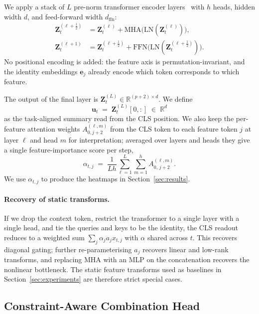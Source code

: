 \documentclass[journal]{IEEEtran}
\begin{document}
We apply a stack of $L$ pre-norm transformer encoder layers~\cite{vaswani2017attention} with $h$ heads, hidden width $d$, and feed-forward width $d_{\mathrm{ffn}}$:
\begin{align}
\mathbf{Z}_t^{(\ell+\tfrac{1}{2})} &= \mathbf{Z}_t^{(\ell)} + \mathrm{MHA}\!\bigl(\mathrm{LN}(\mathbf{Z}_t^{(\ell)})\bigr),\\
\mathbf{Z}_t^{(\ell+1)} &= \mathbf{Z}_t^{(\ell+\tfrac{1}{2})} + \mathrm{FFN}\!\bigl(\mathrm{LN}(\mathbf{Z}_t^{(\ell+\tfrac{1}{2})})\bigr).
\end{align}
No positional encoding is added: the feature axis is permutation-invariant, and the identity embeddings $\mathbf{e}_j$ already encode which token corresponds to which feature.

The output of the final layer is $\mathbf{Z}_t^{(L)} \in \mathbb{R}^{(p+2)\times d}$. We define
\begin{equation}
\mathbf{u}_t \;=\; \mathbf{Z}_t^{(L)}[0,:] \;\in\; \mathbb{R}^d
\end{equation}
as the task-aligned summary read from the CLS position. We also keep the per-feature attention weights $A^{(\ell,m)}_{0,j+2}$ from the CLS token to each feature token $j$ at layer $\ell$ and head $m$ for interpretation; averaged over layers and heads they give a single feature-importance score per step,
\begin{equation}
\label{eq:alpha}
\alpha_{t,j} \;=\; \frac{1}{Lh} \sum_{\ell=1}^{L} \sum_{m=1}^{h} A^{(\ell,m)}_{0,\,j+2}.
\end{equation}
We use $\alpha_{t,j}$ to produce the heatmaps in Section~\ref{sec:results}.

\paragraph*{Recovery of static transforms.} If we drop the context token, restrict the transformer to a single layer with a single head, and tie the queries and keys to be the identity, the CLS readout reduces to a weighted sum $\sum_j \alpha_j a_j x_{t,j}$ with $\alpha$ shared across $t$. This recovers diagonal gating; further re-parameterising $a_j$ recovers linear and low-rank transforms, and replacing $\mathrm{MHA}$ with an MLP on the concatenation recovers the nonlinear bottleneck. The static feature transforms used as baselines in Section~\ref{sec:experiments} are therefore strict special cases.

\subsection{Constraint-Aware Combination Head}
\end{document}
